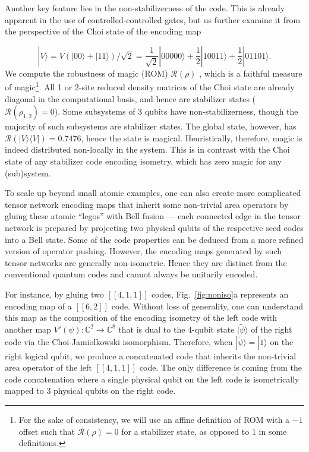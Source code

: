 \documentclass[a4paper,11pt]{article}
\theoremstyle{definition}
\numberwithin{equation}{section}
\begin{document}
Another key feature lies in the non-stabilizerness of the code. This is already apparent in the use of controlled-controlled gates, but us further examine it from the perspective of the Choi state of the encoding map

\begin{equation}|V\rangle = V(|00\rangle+|11\rangle)/\sqrt{2}= \frac{1}{\sqrt{2}}|00000\rangle + \frac 1 2 |10011\rangle + \frac 1 2 |01101\rangle.\end{equation}
We compute the robustness of magic (ROM) $\mathcal{R}(\rho)$ \cite{ROM}, which is a faithful measure of magic\footnote{For the sake of consistency, we will use an affine definition of ROM with a $-1$ offset such that $\mathcal{R}(\rho)=0$ for a stabilizer state, as opposed to 1 in some definitions.}. 
 All 1 or 2-site reduced density matrices of the Choi state are already diagonal in the computational basis, and hence are stabilizer states ($\mathcal{R}(\rho_{1,2})=0$). Some subsystems of 3 qubits have non-stabilizerness, though the majority of such subsystems are stabilizer states. The global state, however, has $\mathcal{R}(|V\rangle\langle V|)=0.7476$, hence the state is magical. Heuristically, therefore, magic is indeed distributed non-locally in the system.
This is in contrast with the Choi state of any stabilizer code encoding isometry, which has zero magic for any (sub)system. 









To scale up beyond small atomic examples, one can also create more complicated tensor network encoding maps that inherit some non-trivial area operators by gluing these atomic ``legos'' with Bell fusion --- each connected edge in the tensor network is prepared by projecting two physical qubits of the respective seed codes into a Bell state. Some of the code properties can be deduced from a more refined version of operator pushing. However, the encoding maps generated by such tensor networks are generally non-isometric. Hence they are distinct from the conventional quantum codes and cannot always be unitarily encoded. 


For instance, by gluing two $[[4,1,1]]$ codes, Fig.~\ref{fig:noniso}a represents an encoding map of a $[[6,2]]$ code. Without loss of generality, one can understand this map as the composition of the encoding isometry of the left code with another map $V'({\psi}):\mathbb{C}^{2}\rightarrow \mathbb{C}^8$ that is dual to the 4-qubit state $|\tilde{\psi}\rangle$ of the right code via the Choi-Jamiolkowski isomorphism. Therefore, when $|\tilde{\psi}\rangle =|\tilde{1}\rangle$ on the right logical qubit, we produce a concatenated code that inherits the non-trivial area operator of the left $[[4,1,1]]$ code. The only difference is coming from the code concatenation where a single physical qubit on the left code is isometrically mapped to 3 physical qubits on the right code. 
\end{document}
